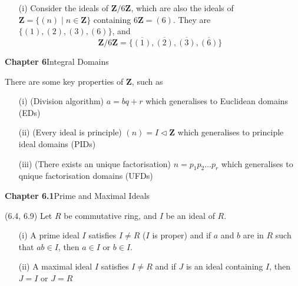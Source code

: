 \vspace{2ex}
\begin{ex}
\begin{itemize}
\item[(i)] Consider the ideals of ${\bm Z}/6{\bm Z}$, which are also the ideals of ${\bm Z}=\{(n) \;|\; n\in {\bm Z}\}$ containing $6{\bm Z}=(6)$. They are $\{ (1),(2),(3),(6)\}$, and
\[{\bm Z}/6{\bm Z}=\{\overline{(1)},\overline{(2)},\overline{(3)},\overline{(6)}\}\]
\end{itemize}
\end{ex}
\vspace{2ex}
{\bf Chapter 6}\hspace{2ex}Integral Domains
\\
\begin{rmk}
There are some key properties of ${\bm Z}$, such as
\begin{itemize}
\item[(i)] (Division algorithm) $a=bq+r$ which generalises to Euclidean domains (EDs)
\item[(ii)] (Every ideal is principle) $(n)=I\triangleleft {\bm Z}$ which generalises to principle ideal domains (PIDs)
\item[(iii)] (There exists an unique factorisation) $n=p_1p_2\ldots p_{r}$ which generalises to qnique factorisation domains (UFDs)
\end{itemize}
\end{rmk}
\vspace{2ex}
{\bf Chapter 6.1}\hspace{2ex}Prime and Maximal Ideals
\\
\begin{defi}
(6.4, 6.9) Let $R$ be commutative ring, and $I$ be an ideal of $R$. 
\begin{itemize}
\item[(i)] A prime ideal $I$ satisfies $I\ne R$ ($I$ is proper) and if $a$ and $b$ are in $R$ such that $ab\in I$, then $a\in I$ or $b\in I$. 
\item[(ii)] A maximal ideal $I$ satisfies $I\ne R$ and if $J$ is an ideal containing $I$, then $J=I$ or $J=R$ 
\end{itemize}
\begin{center}
\end{center}
\end{defi}
